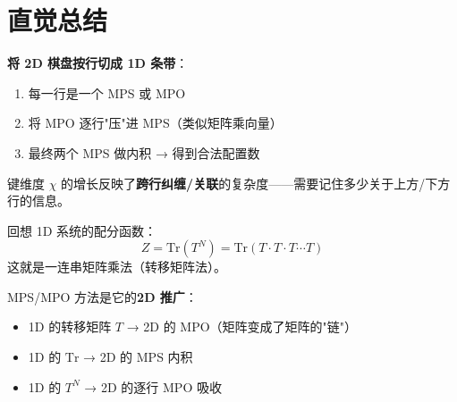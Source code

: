 \documentclass[12pt,a4paper]{article}
\begin{document}
\section{直觉总结}

\begin{sumbox}[一句话理解整个方法]
\textbf{将 2D 棋盘按行切成 1D 条带}：
\begin{enumerate}
  \item 每一行是一个 MPS 或 MPO
  \item 将 MPO 逐行"压"进 MPS（类似矩阵乘向量）
  \item 最终两个 MPS 做内积 → 得到合法配置数
\end{enumerate}

键维度 $\chi$ 的增长反映了\textbf{跨行纠缠/关联}的复杂度——需要记住多少关于上方/下方行的信息。
\end{sumbox}

\begin{sumbox}
回想 1D 系统的配分函数：
$$Z = \text{Tr}(T^N) = \text{Tr}(T \cdot T \cdot T \cdots T)$$
这就是一连串矩阵乘法（转移矩阵法）。

MPS/MPO 方法是它的\textbf{2D 推广}：
\begin{itemize}
  \item 1D 的转移矩阵 $T$ → 2D 的 MPO（矩阵变成了矩阵的"链"）
  \item 1D 的 $\text{Tr}$ → 2D 的 MPS 内积
  \item 1D 的 $T^N$ → 2D 的逐行 MPO 吸收
\end{itemize}
\end{sumbox}
\end{document}
